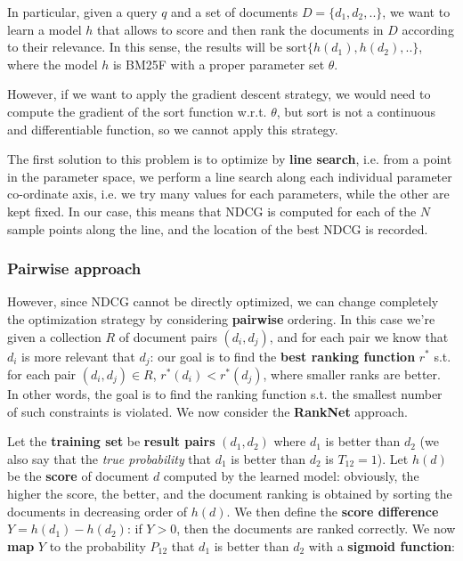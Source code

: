 In particular, given a query $q$ and a set of documents $D = \{ d_1, d_2, .. \}$, we want to learn a model $h$ that allows to score and then rank the documents in $D$ according to their relevance. In this sense, the results will be $\text{sort}\{ h(d_1), h(d_2), .. \}$, where the model $h$ is BM25F with a proper parameter set $\theta$.

However, if we want to apply the gradient descent strategy, we would need to compute the gradient of the sort function w.r.t. $\theta$, but sort is not a continuous and differentiable function, so we cannot apply this strategy.

The first solution to this problem is to optimize by \textbf{line search}, i.e. from a point in the parameter space, we perform a line search along each individual parameter co-ordinate axis, i.e. we try many values for each parameters, while the other are kept fixed. In our case, this means that NDCG is computed for each of the $N$ sample points along the line, and the location of the best NDCG is recorded.

\subsubsection{Pairwise approach}
However, since NDCG cannot be directly optimized, we can change completely the optimization strategy by considering \textbf{pairwise} ordering. In this case we're given a collection $R$ of document pairs $(d_i,d_j)$, and for each pair we know that $d_i$ is more relevant that $d_j$: our goal is to find the \textbf{best ranking function} $r^*$ s.t. for each pair $(d_i, d_j) \in R$, $r^*(d_i) < r^*(d_j)$, where smaller ranks are better. In other words, the goal is to find the ranking function s.t. the smallest number of such constraints is violated. We now consider the \textbf{RankNet} approach.

Let the \textbf{training set} be \textbf{result pairs} $(d_1,d_2)$ where $d_1$ is better than $d_2$ (we also say that the \textit{true probability} that $d_1$ is better than $d_2$ is $T_{12} = 1$). Let $h(d)$ be the \textbf{score} of document $d$ computed by the learned model: obviously, the higher the score, the better, and the document ranking is obtained by sorting the documents in decreasing order of $h(d)$. We then define the \textbf{score difference} $Y = h(d_1) - h(d_2)$: if $Y > 0$, then the documents are ranked correctly. We now \textbf{map} $Y$ to the probability $P_{12}$ that $d_1$ is better than $d_2$ with a \textbf{sigmoid function}:

